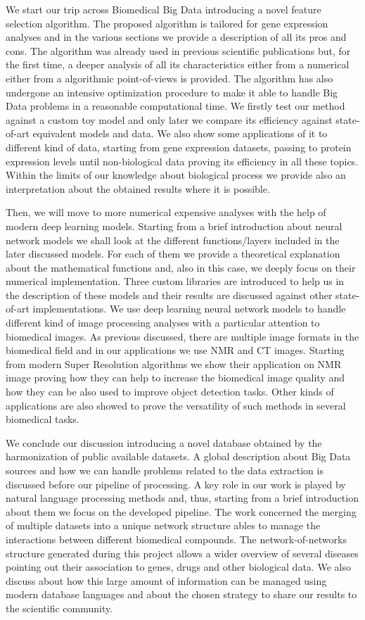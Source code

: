 \documentclass{standalone}
\begin{document}
We start our trip across Biomedical Big Data introducing a novel feature selection algorithm.
The proposed algorithm is tailored for gene expression analyses and in the various sections we provide a description of all its pros and cons.
The algorithm was already used in previous scientific publications but, for the first time, a deeper analysis of all its characteristics either from a numerical either from a algorithmic point-of-views is provided.
The algorithm has also undergone an intensive optimization procedure to make it able to handle Big Data problems in a reasonable computational time.
We firstly test our method against a custom toy model and only later we compare its efficiency against state-of-art equivalent models and data.
We also show some applications of it to different kind of data, starting from gene expression datasets, passing to protein expression levels until non-biological data proving its efficiency in all these topics.
Within the limits of our knowledge about biological process we provide also an interpretation about the obtained results where it is possible.

Then, we will move to more numerical expensive analyses with the help of modern deep learning models.
Starting from a brief introduction about neural network models we shall look at the different functions/layers included in the later discussed models.
For each of them we provide a theoretical explanation about the mathematical functions and, also in this case, we deeply focus on their numerical implementation.
Three custom libraries are introduced to help us in the description of these models and their results are discussed against other state-of-art implementations.
We use deep learning neural network models to handle different kind of image processing analyses with a particular attention to biomedical images.
As previous discussed, there are multiple image formats in the biomedical field and in our applications we use NMR and CT images.
Starting from modern Super Resolution algorithms we show their application on NMR image proving how they can help to increase the biomedical image quality and how they can be also used to improve object detection tasks.
Other kinds of applications are also showed to prove the versatility of such methods in several biomedical tasks.

We conclude our discussion introducing a novel database obtained by the harmonization of public available datasets.
A global description about Big Data sources and how we can handle problems related to the data extraction is discussed before our pipeline of processing.
A key role in our work is played by natural language processing methods and, thus, starting from a brief introduction about them we focus on the developed pipeline.
The work concerned the merging of multiple datasets into a unique network structure ables to manage the interactions between different biomedical compounds.
The network-of-networks structure generated during this project allows a wider overview of several diseases pointing out their association to genes, drugs and other biological data.
We also discuss about how this large amount of information can be managed using modern database languages and about the chosen strategy to share our results to the scientific community.
\end{document}
